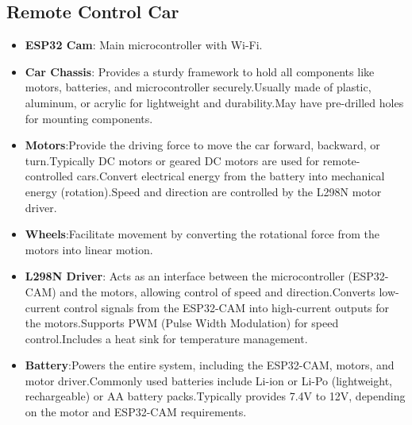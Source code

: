 \documentclass[conference]{IEEEtran}
\begin{document}
\subsection{\textbf{Remote Control Car}}
\begin{itemize}
    \item \textbf{ESP32 Cam}: Main microcontroller with Wi-Fi.
    \item \textbf{Car Chassis}: Provides a sturdy framework to hold all components like motors, batteries, and microcontroller securely.Usually made of plastic, aluminum, or acrylic for lightweight and durability.May have pre-drilled holes for mounting components.
    \item \textbf{Motors}:Provide the driving force to move the car forward, backward, or turn.Typically DC motors or geared DC motors are used for remote-controlled cars.Convert electrical energy from the battery into mechanical energy (rotation).Speed and direction are controlled by the L298N motor driver.
    \item \textbf{Wheels}:Facilitate movement by converting the rotational force from the motors into linear motion.
    \item \textbf{L298N Driver}: Acts as an interface between the microcontroller (ESP32-CAM) and the motors, allowing control of speed and direction.Converts low-current control signals from the ESP32-CAM into high-current outputs for the motors.Supports PWM (Pulse Width Modulation) for speed control.Includes a heat sink for temperature management.
    \item \textbf{Battery}:Powers the entire system, including the ESP32-CAM, motors, and motor driver.Commonly used batteries include Li-ion or Li-Po (lightweight, rechargeable) or AA battery packs.Typically provides 7.4V to 12V, depending on the motor and ESP32-CAM requirements.
\end{itemize}
\end{document}
